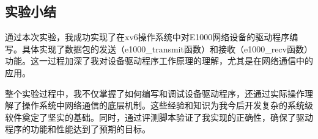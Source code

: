 \subsection{实验小结}

通过本次实验，我成功实现了在xv6操作系统中对E1000网络设备的驱动程序编写。具体实现了数据包的发送（e1000\_transmit函数）和接收（e1000\_recv函数）功能。这一过程加深了我对设备驱动程序工作原理的理解，尤其是在网络通信中的应用。

整个实验过程中，我不仅掌握了如何编写和调试设备驱动程序，还通过实际操作理解了操作系统中网络通信的底层机制。这些经验和知识为我今后开发复杂的系统级软件奠定了坚实的基础。同时，通过评测脚本验证了我实现的正确性，确保了驱动程序的功能和性能达到了预期的目标。